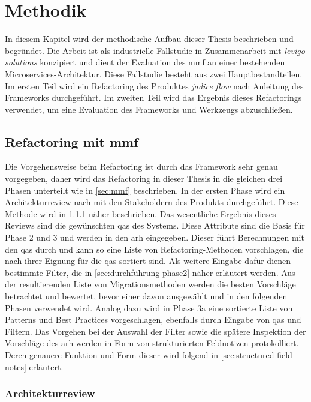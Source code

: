 \chapter{Methodik}
\label{chap:methodik}

In diesem Kapitel wird der methodische Aufbau dieser Thesis beschrieben und begründet.
Die Arbeit ist als industrielle Fallstudie in Zusammenarbeit mit \emph{levigo solutions} konzipiert und dient der Evaluation des \gls{mmf} an einer bestehenden Microservices-Architektur.
Diese Fallstudie besteht aus zwei Hauptbestandteilen.
Im ersten Teil wird ein Refactoring des Produktes \emph{jadice flow} nach Anleitung des Frameworks durchgeführt.
Im zweiten Teil wird das Ergebnis dieses Refactorings verwendet, um eine Evaluation des Frameworks und Werkzeugs abzuschließen.

\section{Refactoring mit \gls{mmf}}

Die Vorgehensweise beim Refactoring ist durch das Framework sehr genau vorgegeben, daher wird das Refactoring in dieser Thesis in die gleichen drei Phasen unterteilt wie in \cref{sec:mmf} beschrieben.
In der ersten Phase wird ein Architekturreview nach  mit den Stakeholdern des Produkts durchgeführt.
Diese Methode wird in \cref{sec:methodik-architekturreview} näher beschrieben.
Das wesentliche Ergebnis dieses Reviews sind die gewünschten \glspl{qa} des Systems.
Diese Attribute sind die Basis für Phase 2 und 3 und werden in den \gls{arh} eingegeben.
Dieser führt Berechnungen mit den \glspl{qa} durch und kann so eine Liste von Refactoring-Methoden vorschlagen, die nach ihrer Eignung für die \glspl{qa} sortiert sind.
Als weitere Eingabe dafür dienen bestimmte Filter, die in \cref{sec:durchführung-phase2} näher erläutert werden.
Aus der resultierenden Liste von Migrationsmethoden werden die besten Vorschläge betrachtet und bewertet, bevor einer davon ausgewählt und in den folgenden Phasen verwendet wird.
Analog dazu wird in Phase 3a eine sortierte Liste von Patterns und Best Practices vorgeschlagen, ebenfalls durch Eingabe von \glspl{qa} und Filtern.
Das Vorgehen bei der Auswahl der Filter sowie die spätere Inspektion der Vorschläge des \gls{arh} werden in Form von strukturierten Feldnotizen protokolliert.
Deren genauere Funktion und Form dieser wird folgend in \cref{sec:structured-field-notes} erläutert.

\subsection{Architekturreview}
\label{sec:methodik-architekturreview}


